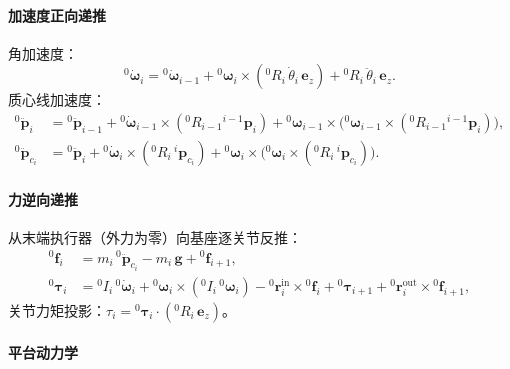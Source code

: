 \paragraph{加速度正向递推}

角加速度：
\begin{equation}
    {}^{0}\dot{\boldsymbol{\omega}}_i = {}^{0}\dot{\boldsymbol{\omega}}_{i-1}
    + {}^{0}\boldsymbol{\omega}_i\times({}^{0}R_i\,\dot{\theta}_i\,\mathbf{e}_z)
    + {}^{0}R_i\,\ddot{\theta}_i\,\mathbf{e}_z.
\end{equation}
质心线加速度：
\begin{align}
    {}^{0}\ddot{\mathbf{p}}_i &= {}^{0}\ddot{\mathbf{p}}_{i-1}
    + {}^{0}\dot{\boldsymbol{\omega}}_{i-1}\!\times\!({}^{0}R_{i-1}{}^{i-1}\mathbf{p}_i)
    + {}^{0}\boldsymbol{\omega}_{i-1}\!\times\!\bigl({}^{0}\boldsymbol{\omega}_{i-1}
      \!\times\!({}^{0}R_{i-1}{}^{i-1}\mathbf{p}_i)\bigr), \\
    {}^{0}\ddot{\mathbf{p}}_{c_i} &= {}^{0}\ddot{\mathbf{p}}_i
    + {}^{0}\dot{\boldsymbol{\omega}}_i\!\times\!({}^{0}R_i\,{}^{i}\mathbf{p}_{c_i})
    + {}^{0}\boldsymbol{\omega}_i\!\times\!\bigl({}^{0}\boldsymbol{\omega}_i
      \!\times\!({}^{0}R_i\,{}^{i}\mathbf{p}_{c_i})\bigr).
\end{align}

\paragraph{力逆向递推}

从末端执行器（外力为零）向基座逐关节反推：
\begin{align}
    {}^{0}\mathbf{f}_i &= m_i\,{}^{0}\ddot{\mathbf{p}}_{c_i}
    - m_i\,\mathbf{g} + {}^{0}\mathbf{f}_{i+1}, \\
    {}^{0}\boldsymbol{\tau}_i &= {}^{0}I_i\,{}^{0}\dot{\boldsymbol{\omega}}_i
    + {}^{0}\boldsymbol{\omega}_i\!\times\!({}^{0}I_i\,{}^{0}\boldsymbol{\omega}_i)
    - {}^{0}\mathbf{r}^{\mathrm{in}}_i\times{}^{0}\mathbf{f}_i
    + {}^{0}\boldsymbol{\tau}_{i+1}
    + {}^{0}\mathbf{r}^{\mathrm{out}}_i\times{}^{0}\mathbf{f}_{i+1},
\end{align}
关节力矩投影：$\tau_i = {}^{0}\boldsymbol{\tau}_i\cdot({}^{0}R_i\,\mathbf{e}_z)$。

\paragraph{平台动力学}

